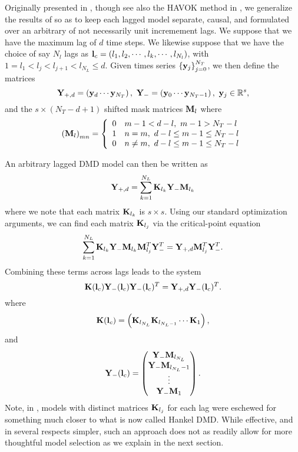 \documentclass[a4paper,11pt]{article}
\newcommand{\ba}{\begin{array}}
\newcommand{\ea}{\end{array}}
\begin{document}
Originally presented in \cite{clainche}, though see also the HAVOK method in , we generalize the results of \cite{clainche} so as to keep each lagged model separate, causal, and formulated over an arbitrary of not necessarily unit incremement lags.  We suppose that we have the maximum lag of $d$ time steps.  We likewise suppose that we have the choice of say $N_{l}$ lags as ${\bf l}_{c}=(l_{1}, l_{2}, \cdots, l_{k}, \cdots, l_{N_{l}})$, with $1=l_{1} < l_{j} < l_{j+1} < l_{N_{L}}\leq d$.  Given times series $\left\{{\bf y}_{j}\right\}_{j=0}^{N_{T}}$, we then define the matrices 
\[
{\bf Y}_{+,d} = \left({\bf y}_{d} \cdots {\bf y}_{N_{T}}\right), ~ {\bf Y}_{-} = \left({\bf y}_{0} \cdots {\bf y}_{N_{T}-1}\right), ~ {\bf y}_{j}\in\mathbb{R}^{s},
\]  
and the $s\times (N_{T}-d+1)$ shifted mask matrices ${\bf M}_{l}$ where
\[
\left({\bf M}_{l}\right)_{mn} = \left\{
\ba{rl}
0 & m-1 < d-l, ~ m-1 > N_{T} - l\\
1 & n=m, ~ d-l\leq m-1 \leq N_{T} - l\\
0 & n\neq m, ~ d-l\leq m-1 \leq N_{T} - l
\ea
\right.
\]

An arbitrary lagged DMD model can then be written as 
\[
{\bf Y}_{+,d} = \sum_{k=1}^{N_{L}}{\bf K}_{l_{k}}{\bf Y}_{-}{\bf M}_{l_{k}}
\]
where we note that each matrix ${\bf K}_{l_{k}}$ is $s\times s$.  Using our standard optimization arguments, we can find each matrix ${\bf K}_{l_{j}}$ via the critical-point equation
\[
\sum_{k=1}^{N_{L}}{\bf K}_{l_{k}}{\bf Y}_{-}{\bf M}_{l_{k}}{\bf M}_{l_{j}}^{T}{\bf Y}_{-}^{T} = {\bf Y}_{+,d}{\bf M}_{l_{j}}^{T}{\bf Y}_{-}^{T}.
\]
Combining these terms across lags leads to the system 
\[
{\bf K}({\bf l}_{c}) {\bf Y}_{-}({\bf l}_{c}){\bf Y}_{-}({\bf l}_{c})^{T} = {\bf Y}_{+, d}{\bf Y}_{-}({\bf l}_{c})^{T}.
\]
where
\[
{\bf K}({\bf l}_{c}) = \left({\bf K}_{l_{N_{L}}} {\bf K}_{l_{N_{L}-1}} \cdots {\bf K}_{1}\right), 
\]
and
\[
{\bf Y}_{-}({\bf l}_{c}) = \begin{pmatrix} {\bf Y}_{-}{\bf M}_{l_{N_{L}}} \\ {\bf Y}_{-}{\bf M}_{l_{N_{L}}-1} \\ \vdots \\ {\bf Y}_{-}{\bf M}_{1} \end{pmatrix}.
\]
Note, in \cite{clainche}, models with distinct matrices ${\bf K}_{l_{j}}$ for each lag were eschewed for something much closer to what is now called Hankel DMD.  While effective, and in several respects simpler, such an approach does not as readily allow for more thoughtful model selection as we explain in the next section.  
\end{document}
